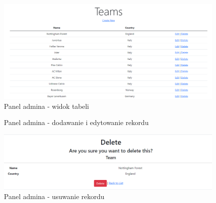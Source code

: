 \documentclass[]{article}
\begin{document}
\begin{figure}[H]
	\centering
	\includegraphics[scale=0.4]{admin-panel-teams}
	\caption{Panel admina - widok tabeli}
\end{figure}

\begin{figure}[H]%
	\centering
	\qquad
	\caption{Panel admina - dodawanie i edytowanie rekordu}%
\end{figure}

\begin{figure}[H]
	\centering
	\includegraphics[scale=0.4]{team-delete}
	\caption{Panel admina - usuwanie rekordu}
\end{figure}
\end{document}
